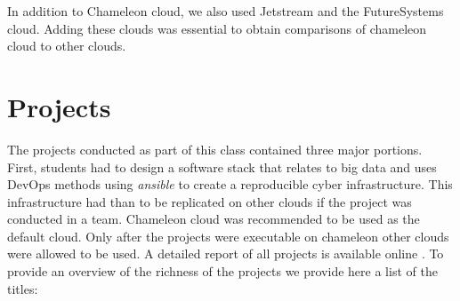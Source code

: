 \documentclass[sigconf]{acmart}
\begin{document}
In addition to Chameleon cloud, we also used Jetstream and the
FutureSystems cloud. Adding these clouds was essential to obtain
comparisons of chameleon cloud to other clouds.

\section{Projects}

The projects conducted as part of this class contained three major
portions. First, students had to design a software stack that relates
to big data and uses DevOps methods using {\it ansible} to create a
reproducible cyber infrastructure. This infrastructure had than to be
replicated on other clouds if the project was conducted in a
team. Chameleon cloud was recommended to be used as the default
cloud. Only after the projects were executable on chameleon other
clouds were allowed to be used.  A detailed report of all projects is
available online \cite{www-las-i524-sp17}. To provide an overview of
the richness of the projects we provide here a list of the titles:
\end{document}
